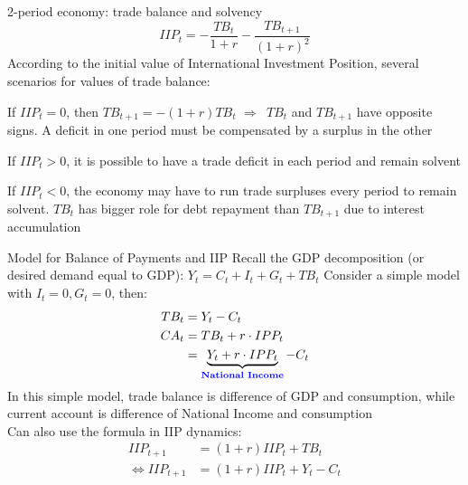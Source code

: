 \documentclass{beamer}
\newcommand{\tb}[1]{{\color{blue}{\textbf{#1}}}}
\newenvironment{mytemize}
{\vfill\itemize[nolistsep,itemsep=\fill,label=\color{blue}{$\triangleright$}]}
  {\enditemize}
\newcommand{\rarr}{$\Rightarrow$\ }
\begin{document}
\begin{frame}{2-period economy: trade balance and solvency}
$$IIP_t = -\frac{TB_t}{1+r} - \frac{TB_{t+1}}{(1+r)^2}$$
According to the initial value of International Investment Position, several scenarios for values of trade balance:
\begin{mytemize}
    \item If $IIP_t=0$, then $TB_{t+1} = -(1+r) TB_t$ \rarr $TB_t$ and $TB_{t+1}$  have opposite signs. A deficit in one period must be compensated by a surplus in the other
    \item If $IIP_{t} > 0$, it is possible to have a trade deficit in each period and remain solvent
    \item If $IIP_{t} < 0$, the economy may have to run trade surpluses every period to remain solvent. $TB_t$ has bigger role for debt repayment than $TB_{t+1}$ due to interest accumulation
\end{mytemize}

    
\end{frame}


\begin{frame}{Model for Balance of Payments and IIP}
  Recall the GDP decomposition (or desired demand equal to GDP): $Y_t = C_t + I_t + G_t + TB_t$ \vfill
  Consider a simple model with $I_t = 0, G_t = 0$, then: 
  \begin{align*}
  TB_t &= Y_t - C_t \\
  CA_t &= TB_t + r\cdot  IPP_t \\ &= \underbrace{Y_t+ r\cdot  IPP_t}_{\text{\tb{National Income}}} - C_t 
  \end{align*}
In this simple model, trade balance is difference of GDP and consumption, while current account is difference of National Income and consumption \\
\vfill
Can also use the formula in IIP dynamics:
 \begin{align*}
     IIP_{t+1} &= (1+r) IIP_t + TB_t \\
     \Leftrightarrow IIP_{t+1} &= (1+r) IIP_t + Y_t - C_t \\
 \end{align*}
\end{frame}
\end{document}
